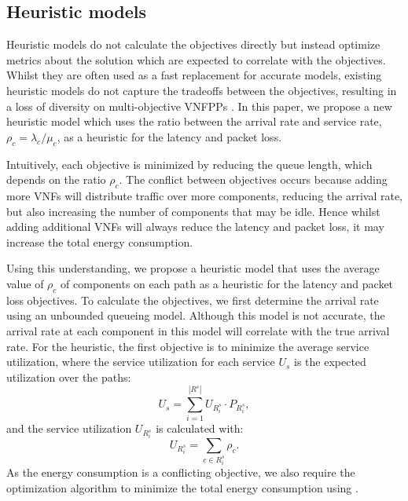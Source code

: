 \subsection{Heuristic models}
Heuristic models do not calculate the objectives directly but instead optimize metrics about the solution which are expected to correlate with the objectives. Whilst they are often used as a fast replacement for accurate models, existing heuristic models do not capture the tradeoffs between the objectives, resulting in a loss of diversity on multi-objective VNFPPs \cite{BillingsleyLMMG22}. In this paper, we propose a new heuristic model which uses the ratio between the arrival rate and service rate, $\rho_c  = \lambda_c / \mu_c$, as a heuristic for the latency and packet loss.

Intuitively, each objective is minimized by reducing the queue length, which depends on the ratio $\rho_c$. The conflict between objectives occurs because adding more VNFs will distribute traffic over more components, reducing the arrival rate, but also increasing the number of components that may be idle. Hence whilst adding additional VNFs will always reduce the latency and packet loss, it may increase the total energy consumption. 

Using this understanding, we propose a heuristic model that uses the average value of $\rho_c$ of components on each path as a heuristic for the latency and packet loss objectives. To calculate the objectives, we first determine the arrival rate using an unbounded queueing model. Although this model is not accurate, the arrival rate at each component in this model will correlate with the true arrival rate. For the heuristic, the first objective is to minimize the average service utilization, where the service utilization for each service $U_s$ is the expected utilization over the paths:
\begin{equation}
	U_s=\sum_{i=1}^{|R^s|} U_{R^s_i} \cdot P_{R^s_i},
\end{equation}
and the service utilization $U_{R^s_i}$ is calculated with:
\begin{equation}
    U_{R^s_i} = \sum_{c\in R^s_i} \rho_c.
\end{equation}
As the energy consumption is a conflicting objective, we also require the optimization algorithm to minimize the total energy consumption using .

